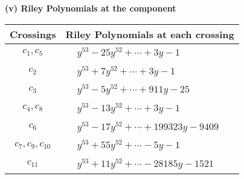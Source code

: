 \documentclass[1p]{elsarticle_modified}
\theoremstyle{definition}
\begin{document}
\newpage\renewcommand{\arraystretch}{1}
\flushleft \textbf{(v) Riley Polynomials at the component}\newline \\
\begin{tabular}{m{50pt}|m{274pt}}
Crossings & \hspace{64pt}Riley Polynomials at each crossing \\
\hline $$\begin{aligned}c_{1},c_{5}\end{aligned}$$&$\begin{aligned}
&y^{53}-25 y^{52}+\cdots+3 y-1
\end{aligned}$\\
\hline $$\begin{aligned}c_{2}\end{aligned}$$&$\begin{aligned}
&y^{53}+7 y^{52}+\cdots+3 y-1
\end{aligned}$\\
\hline $$\begin{aligned}c_{3}\end{aligned}$$&$\begin{aligned}
&y^{53}-5 y^{52}+\cdots+911 y-25
\end{aligned}$\\
\hline $$\begin{aligned}c_{4},c_{8}\end{aligned}$$&$\begin{aligned}
&y^{53}-13 y^{52}+\cdots+3 y-1
\end{aligned}$\\
\hline $$\begin{aligned}c_{6}\end{aligned}$$&$\begin{aligned}
&y^{53}-17 y^{52}+\cdots+199323 y-9409
\end{aligned}$\\
\hline $$\begin{aligned}c_{7},c_{9},c_{10}\end{aligned}$$&$\begin{aligned}
&y^{53}+55 y^{52}+\cdots-5 y-1
\end{aligned}$\\
\hline $$\begin{aligned}c_{11}\end{aligned}$$&$\begin{aligned}
&y^{53}+11 y^{52}+\cdots-28185 y-1521
\end{aligned}$\\
\hline
\end{tabular}\\~\\
\end{document}
